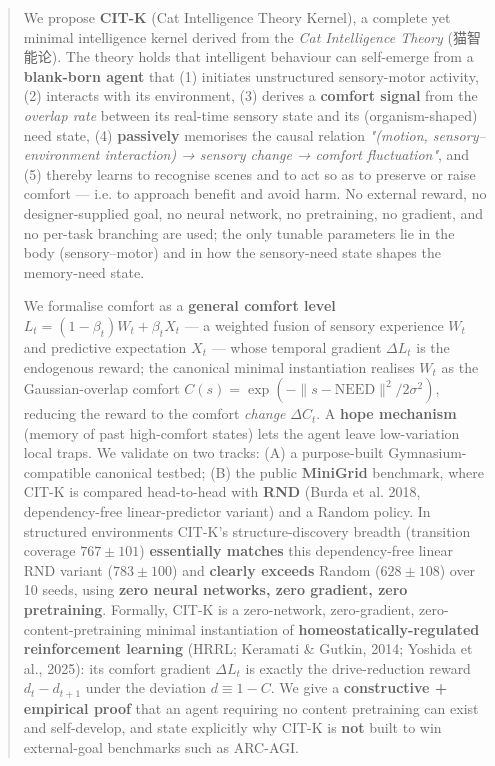 \documentclass[11pt]{article}
\begin{document}
\begin{abstract}

We propose \textbf{CIT-K} (Cat Intelligence Theory Kernel), a complete yet minimal intelligence kernel derived from the \emph{Cat Intelligence Theory} (猫智能论). The theory holds that intelligent behaviour can self-emerge from a \textbf{blank-born agent} that (1) initiates unstructured sensory-motor activity, (2) interacts with its environment, (3) derives a \textbf{comfort signal} from the \emph{overlap rate} between its real-time sensory state and its (organism-shaped) need state, (4) \textbf{passively} memorises the causal relation \emph{"(motion, sensory–environment interaction) → sensory change → comfort fluctuation"}, and (5) thereby learns to recognise scenes and to act so as to preserve or raise comfort — i.e. to approach benefit and avoid harm. No external reward, no designer-supplied goal, no neural network, no pretraining, no gradient, and no per-task branching are used; the only tunable parameters lie in the body (sensory–motor) and in how the sensory-need state shapes the memory-need state.

We formalise comfort as a \textbf{general comfort level} $L_t = (1-\beta_t)W_t + \beta_t X_t$ — a weighted fusion of sensory experience $W_t$ and predictive expectation $X_t$ — whose temporal gradient $\Delta L_t$ is the endogenous reward; the canonical minimal instantiation realises $W_t$ as the Gaussian-overlap comfort $C(s)=\exp(-\|s-\text{NEED}\|^2/2\sigma^2)$, reducing the reward to the comfort \emph{change} $\Delta C_t$. A \textbf{hope mechanism} (memory of past high-comfort states) lets the agent leave low-variation local traps. We validate on two tracks: (A) a purpose-built Gymnasium-compatible canonical testbed; (B) the public \textbf{MiniGrid} benchmark, where CIT-K is compared head-to-head with \textbf{RND} (Burda et al. 2018, dependency-free linear-predictor variant) and a Random policy. In structured environments CIT-K's structure-discovery breadth (transition coverage $767\pm101$) \textbf{essentially matches} this dependency-free linear RND variant ($783\pm100$) and \textbf{clearly exceeds} Random ($628\pm108$) over 10 seeds, using \textbf{zero neural networks, zero gradient, zero pretraining}. Formally, CIT-K is a zero-network, zero-gradient, zero-content-pretraining minimal instantiation of \textbf{homeostatically-regulated reinforcement learning} (HRRL; Keramati \& Gutkin, 2014; Yoshida et al., 2025): its comfort gradient $\Delta L_t$ is exactly the drive-reduction reward $d_t-d_{t+1}$ under the deviation $d\equiv 1-C$. We give a \textbf{constructive + empirical proof} that an agent requiring no content pretraining can exist and self-develop, and state explicitly why CIT-K is \textbf{not} built to win external-goal benchmarks such as ARC-AGI.

\end{abstract}
\end{document}

